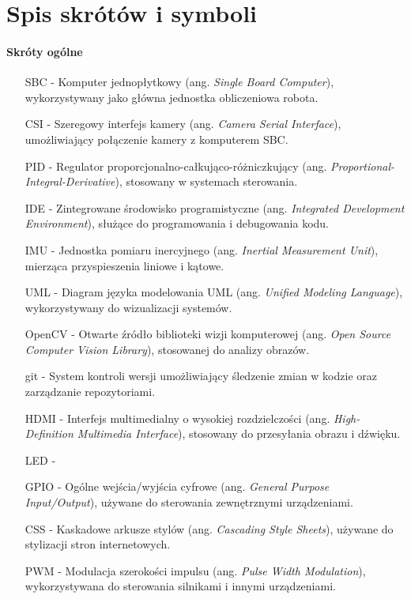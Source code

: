 \chapter{Spis skrótów i symboli}

\subsubsection*{Skróty ogólne}

\begin{itemize}
    \item[SBC] - Komputer jednopłytkowy (ang. \textit{Single Board Computer}), wykorzystywany jako główna jednostka obliczeniowa robota.
    \item[CSI] - Szeregowy interfejs kamery (ang. \textit{Camera Serial Interface}), umożliwiający połączenie kamery z komputerem SBC.
    \item[PID] - Regulator proporcjonalno-całkująco-różniczkujący (ang. \textit{Proportional-Integral-Derivative}), stosowany w systemach sterowania.
    \item[IDE] - Zintegrowane środowisko programistyczne (ang. \textit{Integrated Development Environment}), służące do programowania i debugowania kodu.
    \item[IMU] - Jednostka pomiaru inercyjnego (ang. \textit{Inertial Measurement Unit}), mierząca przyspieszenia liniowe i kątowe.
    \item[UML] - Diagram języka modelowania UML (ang. \textit{Unified Modeling Language}), wykorzystywany do wizualizacji systemów.
    \item[OpenCV] - Otwarte źródło biblioteki wizji komputerowej (ang. \textit{Open Source Computer Vision Library}), stosowanej do analizy obrazów.
    \item[git] - System kontroli wersji umożliwiający śledzenie zmian w kodzie oraz zarządzanie repozytoriami.
    \item[HDMI] - Interfejs multimedialny o wysokiej rozdzielczości (ang. \textit{High-Definition Multimedia Interface}), stosowany do przesyłania obrazu i dźwięku.
    \item[LED] -  
    \item[GPIO] - Ogólne wejścia/wyjścia cyfrowe (ang. \textit{General Purpose Input/Output}), używane do sterowania zewnętrznymi urządzeniami.
    \item[CSS] - Kaskadowe arkusze stylów (ang. \textit{Cascading Style Sheets}), używane do stylizacji stron internetowych.
    \item[PWM] - Modulacja szerokości impulsu (ang. \textit{Pulse Width Modulation}), wykorzystywana do sterowania silnikami i innymi urządzeniami.

\end{itemize}
